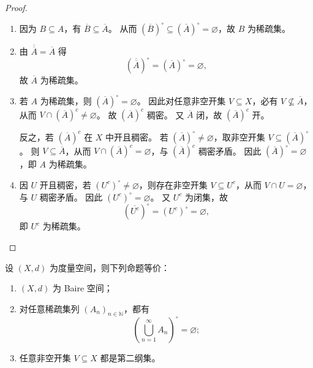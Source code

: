 \documentclass[lang=cn,a4paper,newtx,section]{elegantbook}
\begin{document}
\begin{proof}
  \begin{enumerate}
    \item 因为 $B\subseteq A$，有 $\overline{B}\subseteq \overline{A}$。
    从而 $(\overline{B})^\circ\subseteq (\overline{A})^\circ=\varnothing$，故 $B$ 为稀疏集。

    \item 由 $\overline{\overline{A}}=\overline{A}$ 得
    \[
      (\overline{\overline{A}})^\circ=(\overline{A})^\circ=\varnothing,
    \]
    故 $\overline{A}$ 为稀疏集。

    \item 若 $A$ 为稀疏集，则 $(\overline{A})^\circ=\varnothing$。
    因此对任意非空开集 $V\subseteq X$，必有 $V\not\subseteq\overline{A}$，从而 $V\cap(\overline{A})^c\ne\varnothing$。
    故 $(\overline{A})^c$ 稠密。
    又 $\overline{A}$ 闭，故 $(\overline{A})^c$ 开。

    反之，若 $(\overline{A})^c$ 在 $X$ 中开且稠密。
    若 $(\overline{A})^\circ\ne\varnothing$，取非空开集 $V\subseteq (\overline{A})^\circ$。
    则 $V\subseteq\overline{A}$，从而 $V\cap(\overline{A})^c=\varnothing$，与 $(\overline{A})^c$ 稠密矛盾。
    因此 $(\overline{A})^\circ=\varnothing$，即 $A$ 为稀疏集。

    \item 因 $U$ 开且稠密，若 $(U^c)^\circ\ne\varnothing$，则存在非空开集 $V\subseteq U^c$，从而 $V\cap U=\varnothing$，与 $U$ 稠密矛盾。
    因此 $(U^c)^\circ=\varnothing$。
    又 $U^c$ 为闭集，故
    \[
      (\overline{U^c})^\circ=(U^c)^\circ=\varnothing,
    \]
    即 $U^c$ 为稀疏集。
  \end{enumerate}
\end{proof}

\begin{theorem}\label{thm:baire-space-characterization}
  设 $(X,d)$ 为度量空间，则下列命题等价：
  \begin{enumerate}
    \item $(X,d)$ 为 Baire 空间；
    \item 对任意稀疏集列 $(A_n)_{n\in\mathbb{N}}$，都有
    \[
      \left(\bigcup_{n=1}^{\infty}A_n\right)^\circ=\varnothing;
    \]
    \item 任意非空开集 $V\subseteq X$ 都是第二纲集。
  \end{enumerate}
\end{theorem}
\end{document}
